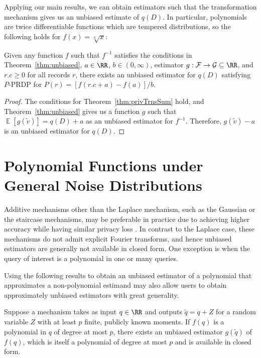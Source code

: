 \documentclass[11pt]{article}
\newcommand{\E}{\operatorname{\mathbb{E}}}
\begin{document}
Applying our main results, we can obtain estimators such that the transformation mechanism gives us an unbiased estimate of $q(D)$. In particular, polynomials are twice differentiable functions which are tempered distributions, so the following holds for $f(x) = \sqrt[k]{x}$:
\begin{corollary}
    Given any function $f$ such that $f^{-1}$ satisfies the conditions in Theorem~\ref{thm:unbiased}, $a \in \RR$, $b \in (0,\infty)$, estimator $g:\mathcal{F} \rightarrow \mathcal{G} \subseteq \RR$, and $r.c \ge 0$ for all records $r$, there exists an unbiased estimator for $q(D)$ satisfying $P$-PRDP for $P(r) = \left[f(r.c + a)-f(a)\right]/b$.
\end{corollary}

\begin{proof}
    The conditions for Theorem~\ref{thm:privTrnsSum} hold, and Theorem~\ref{thm:unbiased} gives us a function $g$ such that $\E[g(\tilde{v})] = q(D) + a$ as an unbiased estimator for $f^{-1}$. Therefore, $g(\tilde{v}) - a$ is an unbiased estimator for $q(D)$.
\end{proof}

\section{Polynomial Functions under General Noise Distributions}
\label{sec:unbiasPoly}

Additive mechanisms other than the Laplace mechanism, such as the Gaussian or the staircase mechanisms, may be preferable in practice due to achieving higher accuracy while having similar privacy loss \cite{dwork06, staircase}.
In contrast to the Laplace case, these mechanisms do not admit explicit Fourier transforms, and hence unbiased estimators are generally not available in closed form.
One exception is when the query of interest is a polynomial in one or many queries. 

Using the following results to obtain an unbiased estimator of a polynomial that approximates a non-polynomial estimand may also allow users to obtain approximately unbiased estimators with great generality.

\begin{theorem}
\label{thm:unbiased-uni-poly}
    Suppose a mechanism takes as input $ q \in \RR$ and outputs $\tilde q = q+Z$ for a random variable $Z$ with at least $p$ finite, publicly known moments.
    If $f(q)$ is a polynomial in $q$ of degree at most $p$, there exists an unbiased estimator $g(\tilde q)$ of $f(q)$, which is itself a polynomial of degree at most $p$ and is available in closed form.
\end{theorem}
\end{document}
